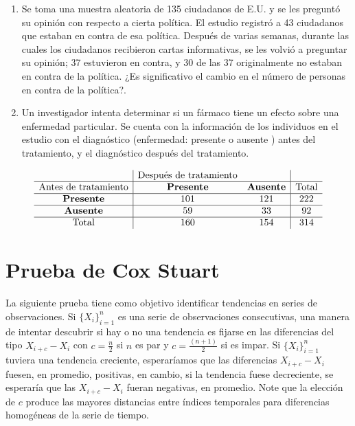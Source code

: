 \documentclass[
  a4paper,
  oneside,
  openany]{book}
\begin{document}
\begin{enumerate}
\def\labelenumi{\arabic{enumi}.}
\item
  Se toma una muestra aleatoria de 135 ciudadanos de E.U. y se les preguntó su opinión con respecto a cierta política. El estudio registró a 43 ciudadanos que estaban en contra de esa política. Después de varias semanas, durante las cuales los ciudadanos recibieron cartas informativas, se les volvió a preguntar su opinión; 37 estuvieron en contra, y 30 de las 37 originalmente no estaban en contra de la política. ¿Es significativo el cambio en el número de personas en contra de la política?.
\item
  Un investigador intenta determinar si un fármaco tiene un efecto sobre una enfermedad particular. Se cuenta con la información de los individuos en el estudio con el diagnóstico (enfermedad: presente o ausente ) antes del tratamiento, y el diagnóstico después del tratamiento.
\end{enumerate}

\[
\begin{array}{c| c c|c} 
&\mbox{Después de tratamiento}&&\\
\hline
\mbox{Antes de tratamiento}& \textbf{Presente} & \textbf{Ausente} & \mbox{Total} \\  
\hline
\textbf{Presente} & 101& 121&222\\
\hline
\textbf{Ausente} & 59& 33&92\\
\hline
\mbox{Total}&160&154&314\\
\end{array}
\]

\hypertarget{prueba-de-cox-stuart}{%
\chapter{Prueba de Cox Stuart}\label{prueba-de-cox-stuart}}

La siguiente prueba tiene como objetivo identificar tendencias en series de observaciones.
Si \(\{X_{i}\}^{n}_{i=1}\) es una serie de observaciones consecutivas, una manera de
intentar descubrir si hay o no una tendencia es fijarse en las diferencias del tipo \(X_{i+c} - X_{i}\) con \(c = \frac{n}{2}\) si \(n\) es par y \(c =\frac{(n + 1)}{2}\) si es impar.
Si \(\{X_{i}\}^{n}_{i=1}\) tuviera una tendencia creciente, esperaríamos que las diferencias \(X_{i+c} - X_{i}\) fuesen, en promedio, positivas, en cambio, si la tendencia fuese decreciente, se esperaría que las \(X_{i+c} - X_{i}\) fueran negativas, en promedio.
Note que la elección de \(c\) produce las mayores distancias entre índices temporales para diferencias homogéneas de la serie de tiempo.
\end{document}
